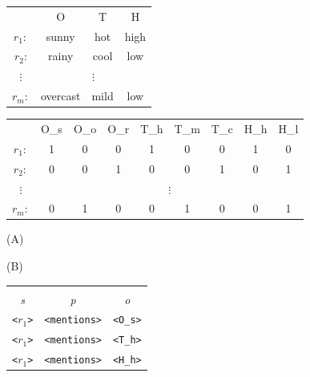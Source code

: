\begin{table}[ht]
\begin{minipage}[b]{0.35\linewidth}
\begin{tabular}{ c | c | c | c |}
\cline{2-4}
	~   & O	    & T  & H   \\
\cline{2-4}
$r_1:$	&    sunny & hot & high  \\
\cline{2-4}
$r_2$:  &   rainy  & cool  & low\\
\cline{2-4}
$\vdots$& \multicolumn{3}{c|}{$\vdots$}\\
\cline{2-4}
$r_m:$	&  overcast  	& mild   & low  \\
\cline{2-4}
\end{tabular}
\end{minipage}
\begin{minipage}[b]{0.55\linewidth}
\begin{tabular}{ c | c | c | c || c | c | c || c | c |}
\cline{2-9}
~     & O\_s & O\_o & O\_r & T\_h & T\_m & T\_c & H\_h & H\_l \\
\cline{2-9}
$r_1:$ & 1 & 0 & 0 & 1 & 0 & 0 & 1 & 0 \\
\cline{2-9}
$r_2:$ & 0 & 0 & 1 & 0 & 0 & 1 & 0 & 1 \\
\cline{2-9}
$\vdots$& \multicolumn{8}{c|}{$\vdots$}\\
\cline{2-9}
$r_m:$ & 0 & 1 & 0 & 0 & 1 & 0 & 0 & 1 \\
\cline{2-9}
\end{tabular}
\end{minipage}
\hspace{1.5cm}
\begin{minipage}[c]{0.35\linewidth}\centering
\vspace{0.2cm}\hspace{1.5cm}(A)
\end{minipage}
\begin{minipage}[c]{0.55\linewidth}\centering
\vspace{0.2cm}\hspace{1.5cm}(B)
\end{minipage}
\begin{minipage}[b]{\linewidth}\centering
\begin{tabular}{c c c}
&&\\
\emph{s}&   \emph{p}&  \emph{o}\\
\texttt{<$r_1$>}   &    \texttt{<mentions>}   &  \texttt{<O\_s>}\\
\texttt{<$r_1$>}   &    \texttt{<mentions>}   &  \texttt{<T\_h>}\\
\texttt{<$r_1$>}   &    \texttt{<mentions>}   &  \texttt{<H\_h>}\\

\end{tabular}
\end{minipage}
\end{table}
